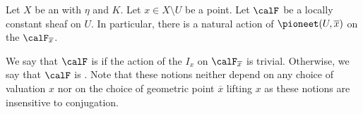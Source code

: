 \begin{definition} \label{definition:unramified_at_a_point_outside_a_dense_open_subscheme_of_an_integral_normal_scheme_for_a_locally_constant_sheaf_on_the_dense_open}
    Let $X$ be an   with  $\eta$ and  $K$. 
    Let $x \in X \setminus U$ be a point. 
    Let $\calF$ be a locally constant sheaf on $U$. In particular, there is a natural action of $\pioneet(U, \overline{x})$ on the  $\calF_{\overline{x}}$.

    We say that $\calF$ is  if the action of the  $I_x$ on 
    $\calF_{\overline{x}}$ is trivial. Otherwise, we say that $\calF$ is . Note that these notions neither depend on any choice of valuation  $x$ nor on the choice of geometric point $\overline{x}$ lifting $x$ as these notions are insensitive to conjugation.
\end{definition}